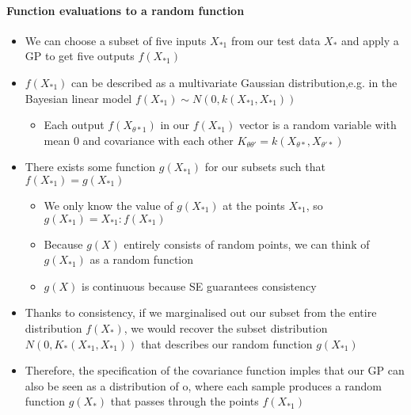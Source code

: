 \documentclass[12pt]{article}
\begin{document}
\paragraph{Function evaluations to a random function}
\begin{itemize}
    \item We can choose a subset of five inputs $X_{*1}$ from our test data $X_*$ and apply a GP to get five outputs $f(X_{*1})$
    \item $f(X_{*1})$ can be described as a multivariate Gaussian distribution,e.g. in the Bayesian linear model $f(X_{*1}) \sim N(0, k(X_{*1}, X_{*1}))$ 
        \begin{itemize}
            \item Each output $f(X_{\theta*1})$ in our $f(X_{*1})$ vector is a random variable with mean $0$ and covariance with each other $K_{\theta\theta'} = k(X_{\theta*}, X_{\theta'*})$ 
        \end{itemize}
    \item There exists some function $g(X_{*1})$ for our subsets such that $f(X_{*1}) = g(X_{*1})$
    \begin{itemize}
        \item We only know the value of $g(X_{*1})$ at the points $X_{*1}$, so $g(X_{*1}) = {X_{*1} : f(X_{*1})}$
        \item Because $g(X)$ entirely consists of random points, we can think of $g(X_{*1})$ as a random function
        \item $g(X)$ is continuous because SE guarantees consistency
    \end{itemize}
\item Thanks to consistency, if we marginalised out our subset from the entire distribution $f(X_*)$, we would recover the subset distribution $N(0, K_*(X_{*1}, X_{*1}))$ that describes our random function $g(X_{*1})$
    \item Therefore, the specification of the covariance function imples that our GP can also be seen as a distribution of o, where each sample produces a random function $g(X_*)$ that passes through the points $f(X_{*1})$
\end{itemize}

\printbibliography
\end{document}
